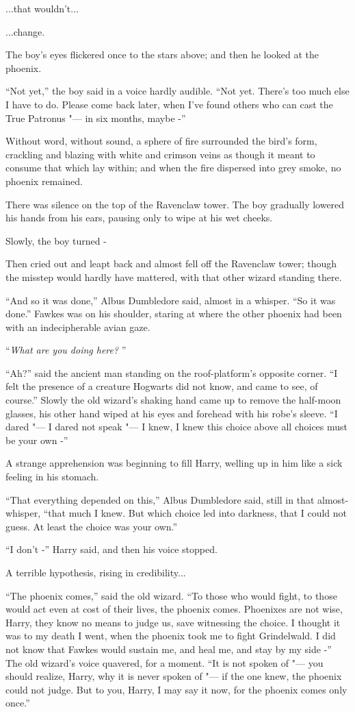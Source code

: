 ...that wouldn't...

...change.

The boy's eyes flickered once to the stars above; and then he looked at
the phoenix.

``Not yet,'' the boy said in a voice hardly audible. ``Not yet. There's
too much else I have to do. Please come back later, when I've found
others who can cast the True Patronus "--- in six months, maybe -''

Without word, without sound, a sphere of fire surrounded the bird's
form, crackling and blazing with white and crimson veins as though it
meant to consume that which lay within; and when the fire dispersed into
grey smoke, no phoenix remained.

There was silence on the top of the Ravenclaw tower. The boy gradually
lowered his hands from his ears, pausing only to wipe at his wet cheeks.

Slowly, the boy turned -

Then cried out and leapt back and almost fell off the Ravenclaw tower;
though the misstep would hardly have mattered, with that other wizard
standing there.

``And so it was done,'' Albus Dumbledore said, almost in a whisper. ``So
it was done.'' Fawkes was on his shoulder, staring at where the other
phoenix had been with an indecipherable avian gaze.

``\emph{What are you doing here?} ''

``Ah?'' said the ancient man standing on the roof-platform's opposite
corner. ``I felt the presence of a creature Hogwarts did not know, and
came to see, of course.'' Slowly the old wizard's shaking hand came up
to remove the half-moon glasses, his other hand wiped at his eyes and
forehead with his robe's sleeve. ``I dared "--- I dared not speak "--- I knew,
I knew this choice above all choices must be your own -''

A strange apprehension was beginning to fill Harry, welling up in him
like a sick feeling in his stomach.

``That everything depended on this,'' Albus Dumbledore said, still in
that almost-whisper, ``that much I knew. But which choice led into
darkness, that I could not guess. At least the choice was your own.''

``I don't -'' Harry said, and then his voice stopped.

A terrible hypothesis, rising in credibility...

``The phoenix comes,'' said the old wizard. ``To those who would fight,
to those would act even at cost of their lives, the phoenix comes.
Phoenixes are not wise, Harry, they know no means to judge us, save
witnessing the choice. I thought it was to my death I went, when the
phoenix took me to fight Grindelwald. I did not know that Fawkes would
sustain me, and heal me, and stay by my side -'' The old wizard's voice
quavered, for a moment. ``It is not spoken of "--- you should realize,
Harry, why it is never spoken of "--- if the one knew, the phoenix could
not judge. But to you, Harry, I may say it now, for the phoenix comes
only once.''

